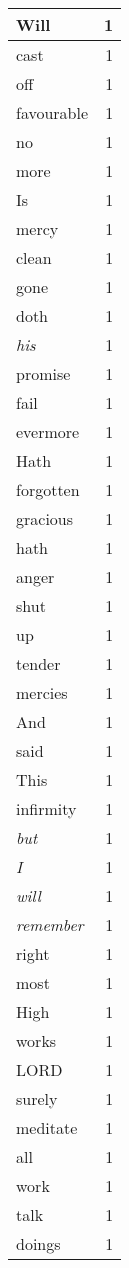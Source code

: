 \begin{center}
\begin{longtable}{l|r}
Will & 1\\ \hline 
cast & 1\\ \hline 
off & 1\\ \hline 
favourable & 1\\ \hline 
no & 1\\ \hline 
more & 1\\ \hline 
Is & 1\\ \hline 
mercy & 1\\ \hline 
clean & 1\\ \hline 
gone & 1\\ \hline 
doth & 1\\ \hline 
\emph{his} & 1\\ \hline 
promise & 1\\ \hline 
fail & 1\\ \hline 
evermore & 1\\ \hline 
Hath & 1\\ \hline 
forgotten & 1\\ \hline 
gracious & 1\\ \hline 
hath & 1\\ \hline 
anger & 1\\ \hline 
shut & 1\\ \hline 
up & 1\\ \hline 
tender & 1\\ \hline 
mercies & 1\\ \hline 
And & 1\\ \hline 
said & 1\\ \hline 
This & 1\\ \hline 
infirmity & 1\\ \hline 
\emph{but} & 1\\ \hline 
\emph{I} & 1\\ \hline 
\emph{will} & 1\\ \hline 
\emph{remember} & 1\\ \hline 
right & 1\\ \hline 
most & 1\\ \hline 
High & 1\\ \hline 
works & 1\\ \hline 
LORD & 1\\ \hline 
surely & 1\\ \hline 
meditate & 1\\ \hline 
all & 1\\ \hline 
work & 1\\ \hline 
talk & 1\\ \hline 
doings & 1\\ \hline 

\end{longtable}
\end{center}
